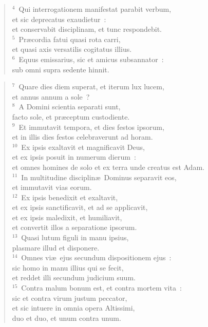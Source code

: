 \begin{verse}${}^{4}$~Qui interrogationem manifestat parabit verbum,\\ et sic deprecatus exaudietur~:\\ et conservabit disciplinam, et tunc respondebit.\\
${}^{5}$~Pr\ae cordia fatui quasi rota carri,\\ et quasi axis versatilis cogitatus illius.\\
${}^{6}$~Equus emissarius, sic et amicus subsannator~:\\ sub omni supra sedente hinnit.\end{verse}


\begin{verse}${}^{7}$~Quare dies diem superat, et iterum lux lucem,\\ et annus annum a sole~?\\
${}^{8}$~A Domini scientia separati sunt,\\ facto sole, et pr\ae ceptum custodiente.\\
${}^{9}$~Et immutavit tempora, et dies festos ipsorum,\\ et in illis dies festos celebraverunt ad horam.\\
${}^{10}$~Ex ipsis exaltavit et magnificavit Deus,\\ et ex ipsis posuit in numerum dierum~:\\ et omnes homines de solo et ex terra unde creatus est Adam.\\
${}^{11}$~In multitudine disciplin\ae\ Dominus separavit eos,\\ et immutavit vias eorum.\\
${}^{12}$~Ex ipsis benedixit et exaltavit,\\ et ex ipsis sanctificavit, et ad se applicavit,\\ et ex ipsis maledixit, et humiliavit,\\ et convertit illos a separatione ipsorum.\\
${}^{13}$~Quasi lutum figuli in manu ipsius,\\ plasmare illud et disponere.\\
${}^{14}$~Omnes vi\ae\ ejus secundum dispositionem ejus~:\\ sic homo in manu illius qui se fecit,\\ et reddet illi secundum judicium suum.\\
${}^{15}$~Contra malum bonum est, et contra mortem vita~:\\ sic et contra virum justum peccator,\\ et sic intuere in omnia opera Altissimi,\\ duo et duo, et unum contra unum.\end{verse}


